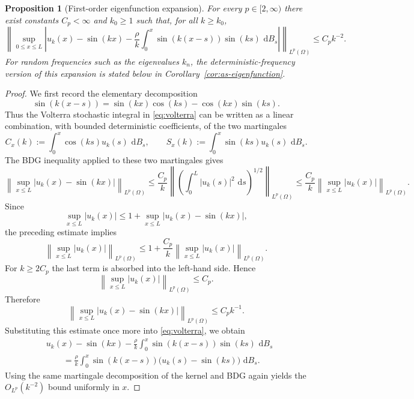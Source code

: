 \documentclass[11pt]{article}
\newtheorem{proposition}[theorem]{Proposition}
\newcommand{\dd}{\,\mathrm d}
\begin{document}
\begin{proposition}[First-order eigenfunction expansion]\label{prop:eigenfunction}
For every $p\in[2,\infty)$ there exist constants $C_p<\infty$ and $k_0\ge1$ such that, for all $k\ge k_0$,
\begin{equation}\label{eq:uk-expansion}
    \left\|\sup_{0\le x\le L}\left|u_k(x)-\sin(kx)-\frac{\rho}{k}\int_0^x\sin(k(x-s))\sin(ks)\,\dd B_s\right|\right\|_{L^p(\Omega)}
    \le C_p k^{-2}.
\end{equation}
For random frequencies such as the eigenvalues $k_n$, the deterministic-frequency version of this expansion is stated below in Corollary~\ref{cor:as-eigenfunction}.
\end{proposition}

\begin{proof}
We first record the elementary decomposition
\[
    \sin(k(x-s))
    =
    \sin(kx)\cos(ks)-\cos(kx)\sin(ks).
\]
Thus the Volterra stochastic integral in \eqref{eq:volterra} can be written as
a linear combination, with bounded deterministic coefficients, of the two
martingales
\[
    C_x(k):=\int_0^x\cos(ks)u_k(s)\,\dd B_s,
    \qquad
    S_x(k):=\int_0^x\sin(ks)u_k(s)\,\dd B_s.
\]
The BDG inequality applied to these two martingales gives
\[
    \left\|\sup_{x\le L}|u_k(x)-\sin(kx)|\right\|_{L^p(\Omega)}
    \le
    \frac{C_p}{k}
    \left\|
        \left(\int_0^L |u_k(s)|^2\,\dd s\right)^{1/2}
    \right\|_{L^p(\Omega)}
    \le
    \frac{C_p}{k}
    \left\|\sup_{x\le L}|u_k(x)|\right\|_{L^p(\Omega)}.
\]
Since
\[
    \sup_{x\le L}|u_k(x)|
    \le 1+\sup_{x\le L}|u_k(x)-\sin(kx)|,
\]
the preceding estimate implies
\[
    \left\|\sup_{x\le L}|u_k(x)|\right\|_{L^p(\Omega)}
    \le 1+\frac{C_p}{k}
    \left\|\sup_{x\le L}|u_k(x)|\right\|_{L^p(\Omega)}.
\]
For $k\ge 2C_p$ the last term is absorbed into the left-hand side. Hence
\[
    \left\|\sup_{x\le L}|u_k(x)|\right\|_{L^p(\Omega)}\le C_p.
\]
Therefore
\[
    \left\|\sup_{x\le L}|u_k(x)-\sin(kx)|\right\|_{L^p(\Omega)}\le C_pk^{-1}.
\]
Substituting this estimate once more into \eqref{eq:volterra}, we obtain
\begin{align*}
&u_k(x)-\sin(kx)-\frac{\rho}{k}\int_0^x\sin(k(x-s))\sin(ks)\,\dd B_s\\
&\qquad=\frac{\rho}{k}\int_0^x\sin(k(x-s))\bigl(u_k(s)-\sin(ks)\bigr)\,\dd B_s.
\end{align*}
Using the same martingale decomposition of the kernel and BDG again yields the
\(O_{L^p}(k^{-2})\) bound uniformly in \(x\).
\end{proof}
\end{document}
